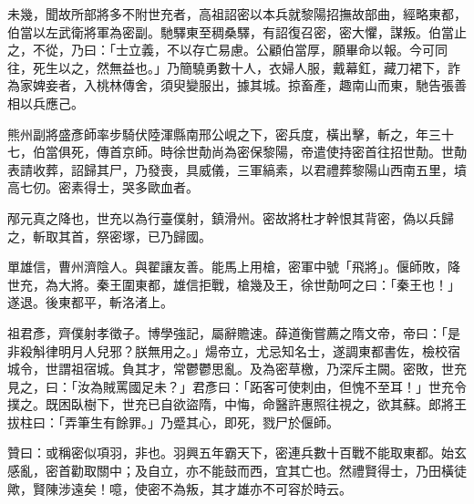 \begin{pinyinscope}
 未幾，聞故所部將多不附世充者，高祖詔密以本兵就黎陽招撫故部曲，經略東都，伯當以左武衛將軍為密副。馳驛東至稠桑驛，有詔復召密，密大懼，謀叛。伯當止之，不從，乃曰：「士立義，不以存亡易慮。公顧伯當厚，願畢命以報。今可同往，死生以之，然無益也。」乃簡驍勇數十人，衣婦人服，戴幕釭，藏刀裙下，詐為家婢妾者，入桃林傳舍，須臾變服出，據其城。掠畜產，趣南山而東，馳告張善相以兵應己。



 熊州副將盛彥師率步騎伏陸渾縣南邢公峴之下，密兵度，橫出擊，斬之，年三十七，伯當俱死，傳首京師。時徐世勣尚為密保黎陽，帝遣使持密首往招世勣。世勣表請收葬，詔歸其尸，乃發喪，具威儀，三軍縞素，以君禮葬黎陽山西南五里，墳高七仞。密素得士，哭多歐血者。



 邴元真之降也，世充以為行臺僕射，鎮滑州。密故將杜才幹恨其背密，偽以兵歸之，斬取其首，祭密塚，已乃歸國。



 單雄信，曹州濟陰人。與翟讓友善。能馬上用槍，密軍中號「飛將」。偃師敗，降世充，為大將。秦王圍東都，雄信拒戰，槍幾及王，徐世勣呵之曰：「秦王也！」遂退。後東都平，斬洛渚上。



 祖君彥，齊僕射孝徵子。博學強記，屬辭贍速。薛道衡嘗薦之隋文帝，帝曰：「是非殺斛律明月人兒邪？朕無用之。」煬帝立，尤忌知名士，遂調東都書佐，檢校宿城令，世謂祖宿城。負其才，常鬱鬱思亂。及為密草檄，乃深斥主闕。密敗，世充見之，曰：「汝為賊罵國足未？」君彥曰：「跖客可使刺由，但愧不至耳！」世充令撲之。既困臥樹下，世充已自欲盜隋，中悔，命醫許惠照往視之，欲其蘇。郎將王拔柱曰：「弄筆生有餘罪。」乃蹙其心，即死，戮尸於偃師。



 贊曰：或稱密似項羽，非也。羽興五年霸天下，密連兵數十百戰不能取東都。始玄感亂，密首勸取關中；及自立，亦不能鼓而西，宜其亡也。然禮賢得士，乃田橫徒歟，賢陳涉遠矣！噫，使密不為叛，其才雄亦不可容於時云。



\end{pinyinscope}